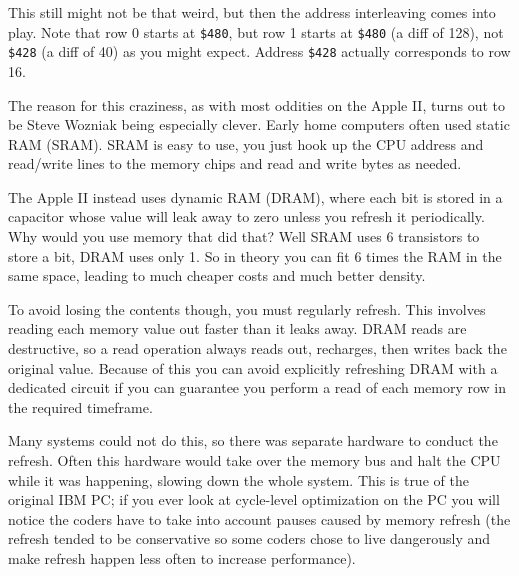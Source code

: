 \documentclass{article}
\begin{document}
This still might not be that weird, but then the address interleaving
comes into play.
Note that row 0 starts at {\tt \$480}, but row 1 starts at
{\tt \$480} (a diff of 128), not {\tt \$428} (a diff of 40)
as you might expect.
Address {\tt \$428} actually corresponds to row 16.

The reason for this craziness, as with most oddities on the Apple II,
turns out to be Steve Wozniak being especially clever.
Early home computers often used static RAM (SRAM).
SRAM is easy to use, you just hook up the CPU address and read/write lines
to the memory chips and read and write bytes as needed.

The Apple II instead uses dynamic RAM (DRAM), where each bit is stored in
a capacitor whose value will leak away to zero unless you
refresh it periodically.
Why would you use memory that did that?
Well SRAM uses 6 transistors to store a bit, DRAM uses only 1.
So in theory you can fit 6 times the RAM in the same space, leading
to much cheaper costs and much better density.

To avoid losing the contents though, you must regularly refresh.
This involves reading each memory value out faster
than it leaks away.
DRAM reads are destructive,
so a read operation always reads out, recharges, then writes back
the original value.
Because of this you can avoid explicitly refreshing DRAM with a dedicated
circuit if you can guarantee you perform a read of each memory row
in the required timeframe.

Many systems could not do this, so there was separate
hardware to conduct the refresh.
Often this hardware would take over the memory bus and halt the CPU
while it was happening, slowing down the whole system.
This is true of the original IBM PC;
if you ever look at cycle-level optimization on the PC
you will notice the coders have to take into account pauses caused by
memory refresh (the refresh tended to be conservative so some coders
chose to live dangerously and make refresh happen less often to increase
performance).

\end{document}
